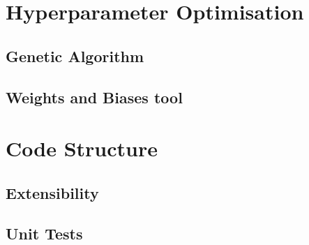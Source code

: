 \section{Hyperparameter Optimisation}


\subsection{Genetic Algorithm}


\subsection{Weights and Biases tool}


\section{Code Structure}


\subsection{Extensibility}

\subsection{Unit Tests}

